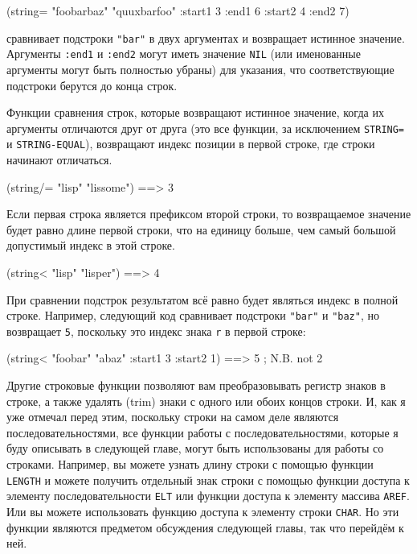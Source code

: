 \begin{myverb}
(string= "foobarbaz" "quuxbarfoo" :start1 3 :end1 6 :start2 4 :end2 7)
\end{myverb}

\noindent{}сравнивает подстроки \lstinline{"bar"} в двух аргументах и возвращает истинное
значение.  Аргументы \lstinline{:end1} и \lstinline{:end2} могут иметь значение
\lstinline{NIL} (или именованные аргументы могут быть полностью убраны) для указания, что
соответствующие подстроки берутся до конца строк.

Функции сравнения строк, которые возвращают истинное значение, когда их аргументы
отличаются друг от друга (это все функции, за исключением \lstinline{STRING=} и
\lstinline{STRING-EQUAL}), возвращают индекс позиции в первой строке, где строки начинают
отличаться.

\begin{myverb}
(string/= "lisp" "lissome") ==> 3
\end{myverb}

Если первая строка является префиксом второй строки, то возвращаемое значение будет равно
длине первой строки, что на единицу больше, чем самый большой допустимый индекс в этой
строке.

\begin{myverb}
(string< "lisp" "lisper") ==> 4
\end{myverb}

При сравнении подстрок результатом всё равно будет являться индекс в полной строке.
Например, следующий код сравнивает подстроки \lstinline{"bar"} и \lstinline{"baz"}, но возвращает
\lstinline{5}, поскольку это индекс знака \lstinline{r} в первой строке:

\begin{myverb}
(string< "foobar" "abaz" :start1 3 :start2 1) ==> 5 ; N.B. not 2
\end{myverb}

Другие строковые функции позволяют вам преобразовывать регистр знаков в строке, а также
удалять (trim) знаки с одного или обоих концов строки.  И, как я уже отмечал перед этим,
поскольку строки на самом деле являются последовательностями, все функции работы с
последовательностями, которые я буду описывать в следующей главе, могут быть использованы
для работы со строками.  Например, вы можете узнать длину строки с помощью функции
\lstinline{LENGTH} и можете получить отдельный знак строки с помощью функции доступа к элементу
последовательности \lstinline{ELT} или функции доступа к элементу массива \lstinline{AREF}.
Или вы можете использовать функцию доступа к элементу строки \lstinline{CHAR}.  Но эти
функции являются предметом обсуждения следующей главы, так что перейдём к ней.

